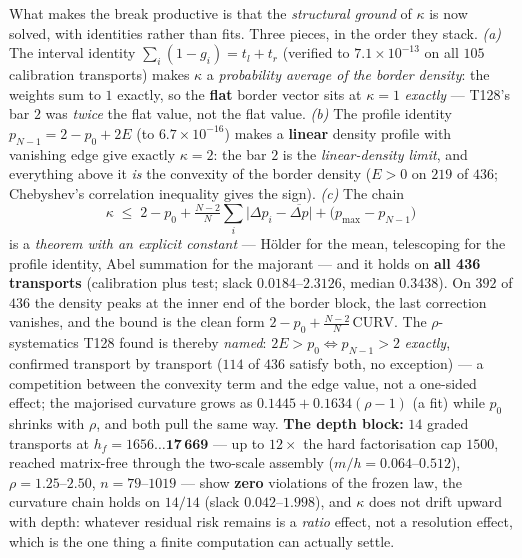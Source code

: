 \documentclass[11pt,a4paper]{article}
\begin{document}
What makes the break productive is that the \emph{structural ground} of $\kappa$ is now
solved, with identities rather than fits. Three pieces, in the order they stack. \emph{(a)}
The interval identity $\sum_i(1-g_i)=t_l+t_r$ (verified to $7.1\times10^{-13}$ on all $105$
calibration transports) makes $\kappa$ a \emph{probability average of the border density}: the
weights sum to $1$ exactly, so the \textbf{flat} border vector sits at $\kappa=1$
\emph{exactly} --- T128's bar $2$ was \emph{twice} the flat value, not the flat value.
\emph{(b)} The profile identity $p_{N-1}=2-p_0+2E$ (to $6.7\times10^{-16}$) makes a
\textbf{linear} density profile with vanishing edge give exactly $\kappa=2$: the bar $2$ is
the \emph{linear-density limit}, and everything above it \emph{is} the convexity of the border
density ($E>0$ on $219$ of $436$; Chebyshev's correlation inequality gives the sign).
\emph{(c)} The chain
\[
\kappa \;\le\; 2 - p_0 + \tfrac{N-2}{N}\sum_i\bigl|\Delta p_i-\overline{\Delta p}\bigr|
+ \bigl(p_{\max}-p_{N-1}\bigr)
\]
is a \emph{theorem with an explicit constant} --- H\"older for the mean, telescoping for the
profile identity, Abel summation for the majorant --- and it holds on \textbf{all 436
transports} (calibration plus test; slack $0.0184$--$2.3126$, median $0.3438$). On $392$ of
$436$ the density peaks at the inner end of the border block, the last correction vanishes,
and the bound is the clean form $2-p_0+\frac{N-2}{N}\,\mathrm{CURV}$. The $\rho$-systematics
T128 found is thereby \emph{named}: $2E>p_0 \iff p_{N-1}>2$ \emph{exactly}, confirmed
transport by transport ($114$ of $436$ satisfy both, no exception) --- a competition between
the convexity term and the edge value, not a one-sided effect; the majorised curvature grows
as $0.1445+0.1634(\rho-1)$ (a fit) while $p_0$ shrinks with $\rho$, and both pull the same
way. \textbf{The depth block:} $14$ graded transports at $h_f=1656\ldots\mathbf{17\,669}$ ---
up to $12\times$ the hard factorisation cap $1500$, reached matrix-free through the two-scale
assembly ($m/h=0.064$--$0.512$), $\rho=1.25$--$2.50$, $n=79$--$1019$ --- show \textbf{zero}
violations of the frozen law, the curvature chain holds on $14/14$ (slack $0.042$--$1.998$),
and $\kappa$ does not drift upward with depth: whatever residual risk remains is a
\emph{ratio} effect, not a resolution effect, which is the one thing a finite computation can
actually settle.
\end{document}

